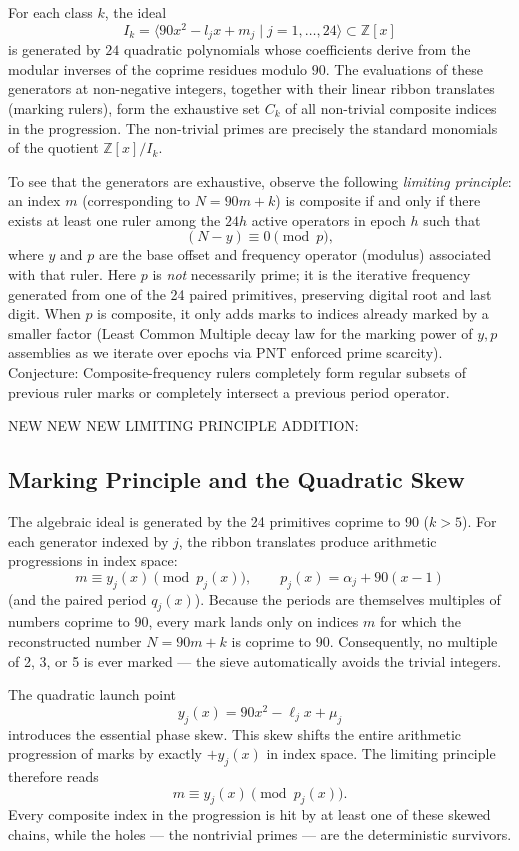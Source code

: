 \documentclass[11pt,a4paper]{article}
\begin{document}
For each class $k$, the ideal
\[
I_k=\langle 90x^2-l_j x+m_j\mid j=1,\dots,24\rangle\subset\mathbb{Z}[x]
\]
is generated by $24$ quadratic polynomials whose coefficients derive from the modular inverses of the coprime residues modulo $90$. The evaluations of these generators at non-negative integers, together with their linear ribbon translates (marking rulers), form the exhaustive set $C_k$ of all non-trivial composite indices in the progression. The non-trivial primes are precisely the standard monomials of the quotient $\mathbb{Z}[x]/I_k$. 

To see that the generators are exhaustive, observe the following \emph{limiting principle}: an index \(m\) (corresponding to \(N=90m+k\)) is composite if and only if there exists at least one ruler among the \(24h\) active operators in epoch \(h\) such that
\[
(N-y)\equiv0\pmod{p},
\]
where \(y\) and \(p\) are the base offset and frequency operator (modulus) associated with that ruler. Here \(p\) is \emph{not} necessarily prime; it is the iterative frequency generated from one of the 24 paired primitives, preserving digital root and last digit. When \(p\) is composite, it only adds marks to indices already marked by a smaller factor (Least Common Multiple decay law for the marking power of \(y,p\) assemblies as we iterate over epochs via PNT enforced prime scarcity). Conjecture: Composite-frequency rulers completely form regular subsets of previous ruler marks or completely intersect a previous period operator. 

NEW NEW NEW LIMITING PRINCIPLE ADDITION:

\subsection{Marking Principle and the Quadratic Skew}

The algebraic ideal is generated by the 24 primitives coprime to 90 (\(k>5\)). For each generator indexed by \(j\), the ribbon translates produce arithmetic progressions in index space:
\[
m \equiv y_j(x) \pmod{p_j(x)}, \qquad p_j(x)=\alpha_j + 90(x-1)
\]
(and the paired period \(q_j(x)\)). Because the periods are themselves multiples of numbers coprime to 90, every mark lands only on indices \(m\) for which the reconstructed number \(N=90m+k\) is coprime to 90. Consequently, no multiple of 2, 3, or 5 is ever marked — the sieve automatically avoids the trivial integers.

The quadratic launch point
\[
y_j(x) = 90x^2 - \ell_j x + \mu_j
\]
introduces the essential phase skew. This skew shifts the entire arithmetic progression of marks by exactly \(+y_j(x)\) in index space. The limiting principle therefore reads
\[
m \equiv y_j(x) \pmod{p_j(x)}.
\]
Every composite index in the progression is hit by at least one of these skewed chains, while the holes — the nontrivial primes — are the deterministic survivors.
\end{document}
